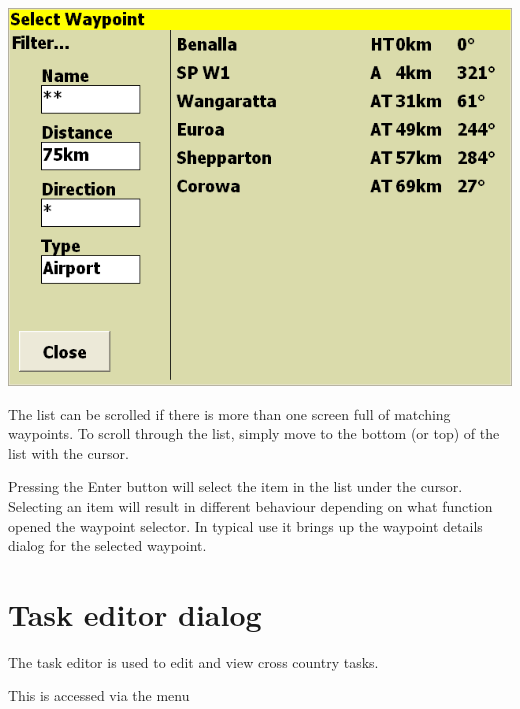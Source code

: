 \documentclass[a4paper,12pt]{refrep}
\begin{document}
\begin{center}
\includegraphics[angle=0,width=\linewidth,keepaspectratio='true']{figures/dialog-waypointselect.png}
\end{center}

The list can be scrolled if there is more than one screen full of
matching waypoints.  To scroll through the list, simply move to the
bottom (or top) of the list with the cursor.  

Pressing the Enter button will select the item in the list under the
cursor.  Selecting an item will result in different behaviour
depending on what function opened the waypoint selector.  In typical
use it brings up the waypoint details dialog for the selected
waypoint.

\section{Task editor dialog}\label{sec:task-editor-dialog}
The task editor is used to edit and view cross country tasks.

This is accessed via the menu
\begin{quote}
\blink{}
\end{quote} 
\end{document}
